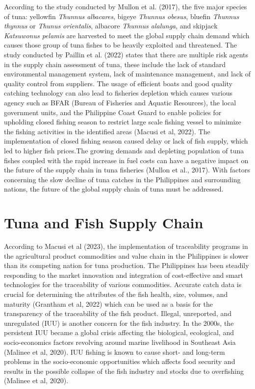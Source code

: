 According to the study conducted by Mullon et al. (2017), the five major species of tuna: yellowfin \textit{Thunnus albacares}, bigeye \textit{Thunnus obesus}, bluefin \textit{Thunnus thynnus} or \textit{Thunus orientalis}, albacore \textit{Thunnus alalunga}, and skipjack \textit{Katsuwonus pelamis} are harvested to meet the global supply chain demand  which causes those group of tuna fishes to be heavily exploited and threatened. The study conducted by Paillin et al. (2022) states that there are multiple risk agents in the supply chain assessment of tuna, these include the lack of standard environmental management system, lack of maintenance management, and lack of quality control from suppliers. The usage of efficient boats and good quality catching technology can also lead to fisheries depletion which causes various agency such as BFAR (Bureau of Fisheries and Aquatic Resources), the local government units, and the Philippine Coast Guard to enable policies for upholding closed fishing season to restrict large scale fishing vessel to minimize the fishing activities in the identified areas (Macusi et al, 2022). The implementation of closed fishing season caused delay or lack of fish supply, which led to higher fish prices.The growing demands and depleting population of tuna fishes coupled with the rapid increase in fuel costs can have a negative impact on the future of the supply chain in tuna fisheries (Mullon et al., 2017). With factors concerning the slow decline of tuna catches in the Philippines and surrounding nations, the future of the global supply chain of tuna must be addressed.

\section{Tuna and Fish Supply Chain}

According to Macusi et al (2023), the implementation of traceability programs in the agricultural product commodities and value chain in the Philippines is slower than its competing nation for tuna production. The Philippines has been steadily responding to the market innovation and integration of cost-effective and smart technologies for the traceability of various commodities. Accurate catch data is crucial for determining the attributes of the fish health, size, volumes, and maturity (Grantham et al, 2022) which can be used as a basis for the transparency of the traceability of the fish product. Illegal, unreported, and unregulated (IUU) is another concern for the fish industry. In the 2000s, the persistent IUU became a global crisis affecting the biological, ecological, and socio-economics factors revolving around marine livelihood in Southeast Asia (Malinee et al, 2020). IUU fishing is known to cause short- and long-term problems in the socio-economic opportunities which affects food security and results in the possible collapse of the fish industry and stocks due to overfishing (Malinee et al, 2020). 

